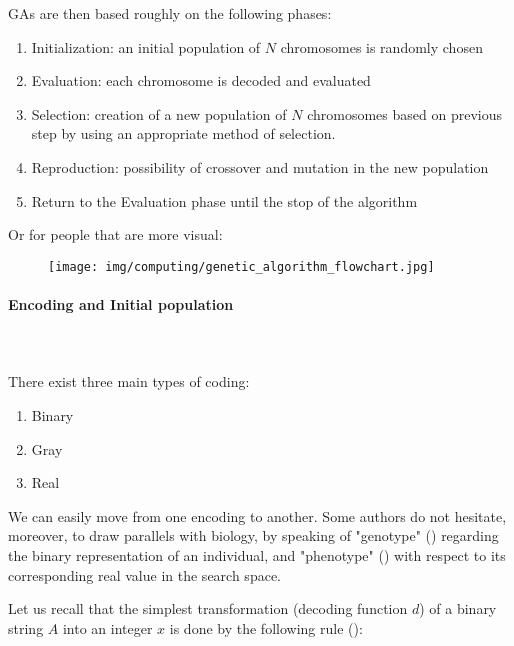 	GAs are then based roughly on the following phases:
	\begin{enumerate}
		\item Initialization: an initial population of $N$ chromosomes is randomly chosen

		\item Evaluation: each chromosome is decoded and evaluated

		\item Selection: creation of a new population of $N$ chromosomes based on previous step by using an appropriate method of selection.

		\item Reproduction: possibility of crossover and mutation in the new population

		\item Return to the Evaluation phase until the stop of the algorithm
	\end{enumerate}
	Or for people that are more visual:
	\begin{figure}[H]
		\centering
		\texttt{[image: img/computing/genetic\_algorithm\_flowchart.jpg]}
	\end{figure}
	
	\paragraph{Encoding and Initial population}\mbox{}\\\\
	There exist three main types of coding:
	\begin{enumerate}
		\item Binary
		\item Gray
		\item Real
	\end{enumerate}
	We can easily move from one encoding to another. Some authors do not hesitate, moreover, to draw parallels with biology, by speaking of "genotype" () regarding the binary representation of an individual, and "phenotype" () with respect to its corresponding real value in the search space.

	Let us recall that the simplest transformation (decoding function $d$) of a binary string $A$ into an integer $x$ is done by the following rule ():
	
